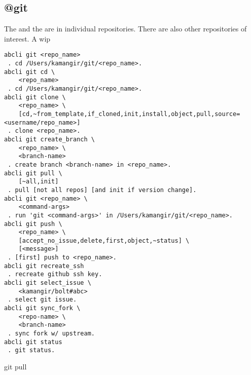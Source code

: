 \subsection{@git}
\label{git}

The  and the  are in individual repositories. There are also other repositories of interest. A wip


\begin{verbatim}
abcli git <repo_name>
 . cd /Users/kamangir/git/<repo_name>.
abcli git cd \
	<repo_name>
 . cd /Users/kamangir/git/<repo_name>.
abcli git clone \
	<repo_name> \
	[cd,~from_template,if_cloned,init,install,object,pull,source=<username/repo_name>]
 . clone <repo_name>.
abcli git create_branch \
	<repo_name> \
	<branch-name>
 . create branch <branch-name> in <repo_name>.
abcli git pull \
	[~all,init]
 . pull [not all repos] [and init if version change].
abcli git <repo_name> \
	<command-args>
 . run 'git <command-args>' in /Users/kamangir/git/<repo_name>.
abcli git push \
	<repo_name> \
	[accept_no_issue,delete,first,object,~status] \
	[<message>]
 . [first] push to <repo_name>.
abcli git recreate_ssh
 . recreate github ssh key.
abcli git select_issue \
	<kamangir/bolt#abc>
 . select git issue.
abcli git sync_fork \
	<repo-name> \
	<branch-name>
 . sync fork w/ upstream.
abcli git status
 . git status.
\end{verbatim}


git pull